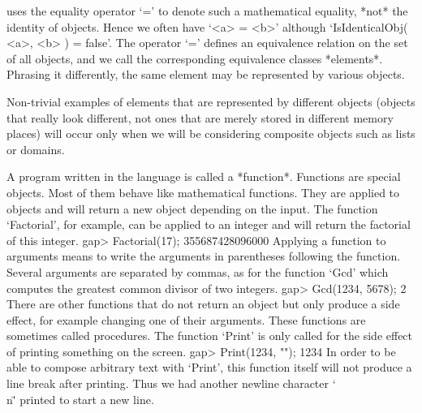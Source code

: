 {\GAP}   uses  the equality operator  `='  to  denote such a mathematical
equality, *not* the identity of objects. Hence we often  have `<a> = <b>'
although `IsIdenticalObj( <a>, <b> ) =  false'.  The operator `=' defines
an equivalence relation on the set of all {\GAP} objects, and we call the
corresponding  equivalence classes *elements*.   Phrasing it differently,
the same element may be represented by various {\GAP} objects.

Non-trivial examples of   elements   that are represented by    different
objects (objects  that really  look different,  not ones  that are merely
stored in  different  memory places)  will  occur only   when  we will be
considering composite objects such as lists or domains.

%


A  program  written  in  the  {\GAP} language  is  called  a  *function*.
Functions  are   special  {\GAP}  objects.   Most  of  them  behave  like
mathematical functions.  They are applied to  objects and  will return  a
new  object  depending  on  the input.   The  function  `Factorial',  for
example,  can be applied to an  integer and will  return the factorial of
this integer.
\beginexample
gap> Factorial(17);
355687428096000 
\endexample
Applying  a  function  to arguments  means  to  write  the  arguments  in
parentheses following the function.   Several arguments are  separated by
commas, as for the  function  `Gcd' which  computes  the greatest  common
divisor of two integers.
\beginexample
gap> Gcd(1234, 5678);
2 
\endexample
There   are other functions that  do  not return   an  object but only
produce  a side effect, for  example changing one  of their arguments.
These functions are sometimes called procedures.  The function `Print'
is only called for the side effect of printing something on the screen.
\beginexample
gap> Print(1234, "\n");
1234 
\endexample
In order to be able to compose arbitrary text with `Print', this function
itself will not produce a line break  after printing. Thus we had another
newline character `\"\\n\"' printed to start a new line.

